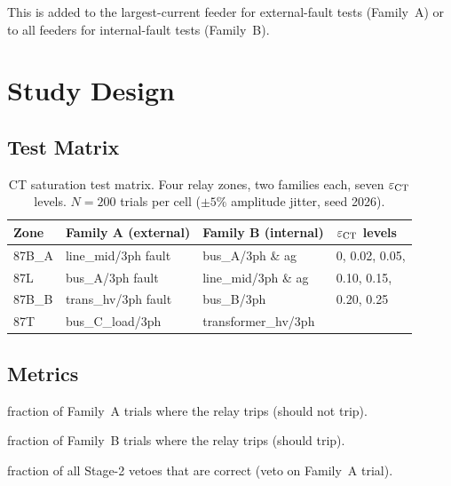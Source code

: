 \documentclass[12pt,a4paper]{article}
\newcommand{\epsct}{\varepsilon_{\rm CT}}
\begin{document}
This is added to the largest-current feeder for external-fault tests
(Family~A) or to all feeders for internal-fault tests (Family~B).

\section{Study Design}

\subsection{Test Matrix}

\begin{table}[ht]
\centering
\caption{CT saturation test matrix.  Four relay zones, two families each,
  seven $\epsct$ levels.  $N=200$ trials per cell ($\pm5\%$ amplitude jitter,
  seed 2026).}
\label{tab:matrix}
\begin{tabular}{llll}
\toprule
Zone  & Family A (external) & Family B (internal) & $\epsct$ levels \\
\midrule
87B\_A & line\_mid/3ph fault & bus\_A/3ph \& ag    & 0, 0.02, 0.05, \\
87L   & bus\_A/3ph fault    & line\_mid/3ph \& ag  & 0.10, 0.15,    \\
87B\_B & trans\_hv/3ph fault & bus\_B/3ph          & 0.20, 0.25     \\
87T   & bus\_C\_load/3ph    & transformer\_hv/3ph  &                \\
\bottomrule
\end{tabular}
\end{table}

\subsection{Metrics}

\begin{description}[noitemsep]
  \item[External FPR] fraction of Family~A trials where the relay trips
    (should not trip).
  \item[Internal TPR] fraction of Family~B trials where the relay trips
    (should trip).
  \item[Veto accuracy] fraction of all Stage-2 vetoes that are correct
    (veto on Family~A trial).
\end{description}
\end{document}
